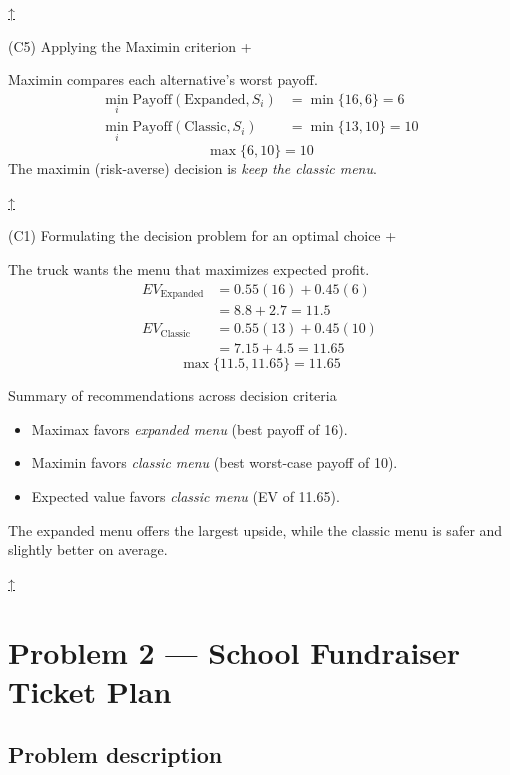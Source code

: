 \documentclass[11pt]{article}
\begin{document}
	
	\hyperref[problem1-criteria]{↑}
	
	
	
	
	(C5) Applying the Maximin criterion
	+
	
	
	Maximin compares each alternative's worst payoff.
	\[
	\begin{aligned}
		\min_i \text{Payoff}(\text{Expanded}, S_i) &= \min\{16, 6\} = 6 \\
		\min_i \text{Payoff}(\text{Classic}, S_i) &= \min\{13, 10\} = 10
	\end{aligned}
	\]
	\[
	\max\{6, 10\} = 10
	\]
	The maximin (risk-averse) decision is \emph{keep the classic menu}.
	
	
	\hyperref[problem1-criteria]{↑}
	
	
	
	
	(C1) Formulating the decision problem for an optimal choice
	+
	
	
	The truck wants the menu that maximizes expected profit.
	\[
	\begin{aligned}
		EV_{\text{Expanded}} &= 0.55(16) + 0.45(6) \\
		&= 8.8 + 2.7 = 11.5 \\
		EV_{\text{Classic}} &= 0.55(13) + 0.45(10) \\
		&= 7.15 + 4.5 = 11.65
	\end{aligned}
	\]
	\[
	\max\{11.5, 11.65\} = 11.65
	\]
	
	Summary of recommendations across decision criteria
	\begin{itemize}
		\item Maximax favors \emph{expanded menu} (best payoff of 16).
		\item Maximin favors \emph{classic menu} (best worst-case payoff of 10).
		\item Expected value favors \emph{classic menu} (EV of 11.65).
	\end{itemize}
	
	
	
	The expanded menu offers the largest upside, while the classic menu is safer and slightly better on average.
	
	
	
	\hyperref[problem1-criteria]{↑}
	\section*{Problem 2 — School Fundraiser Ticket Plan}
	
	\label{problem2}
	
	\subsection*{Problem description}
	
\end{document}
